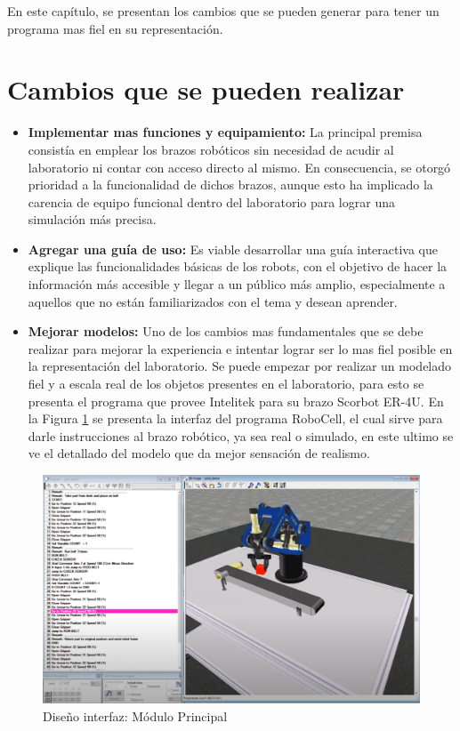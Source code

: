 En este capítulo, se presentan los cambios que se pueden generar para tener un programa mas fiel en su representación.
\section{Cambios que se pueden realizar}
\begin{itemize}
    \item \textbf{Implementar mas funciones y equipamiento:} La principal premisa consistía en emplear los brazos robóticos sin necesidad de acudir al laboratorio ni contar con acceso directo al mismo. En consecuencia, se otorgó prioridad a la funcionalidad de dichos brazos, aunque esto ha implicado la carencia de equipo funcional dentro del laboratorio para lograr una simulación más precisa.
    \item \textbf{Agregar una guía de uso:} Es viable desarrollar una guía interactiva que explique las funcionalidades básicas de los robots, con el objetivo de hacer la información más accesible y llegar a un público más amplio, especialmente a aquellos que no están familiarizados con el tema y desean aprender.
    \item \textbf{Mejorar modelos:} Uno de los cambios mas fundamentales que se debe realizar para mejorar la experiencia e intentar lograr ser lo mas fiel posible en la representación del laboratorio.
    Se puede empezar por realizar un modelado fiel y a escala real de los objetos presentes en el laboratorio, para esto se presenta el programa que provee Intelitek para su brazo Scorbot ER-4U.
    En la Figura \ref{fig:modelo} se presenta la interfaz del programa RoboCell, el cual sirve para darle instrucciones al brazo robótico, ya sea real o simulado, en este ultimo se ve el detallado del modelo que da mejor sensación de realismo.
\end{itemize}
\clearpage
\begin{figure}[h]
\centering
\includegraphics[width=13cm]{figures/modelo.png}
\caption{Diseño interfaz: Módulo Principal}
\label{fig:modelo}
\end{figure}
